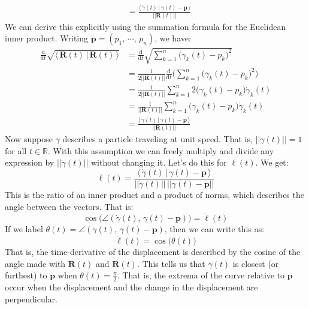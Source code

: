 \documentclass{article}
\theoremstyle{normal}
\newenvironment{example}{%
    \pushQED{\qed}\renewcommand{\qedsymbol}{$\blacksquare$}\examplex%
}{%
    \popQED\endexamplex%
}
\begin{document}
\begin{example}[\textbf{Displacements and Angles}]
\begin{align}
            &=
            \frac{\langle\,\dot{\gamma}(t)\,|\,\gamma(t)-\mathbf{p}\,\rangle}
                {||\mathbf{R}(t)||}
        \end{align}
        We can derive this explicitly using the summation formula for the
        Euclidean inner product. Writing
        $\mathbf{p}=(p_{1},\,\cdots,\,p_{n})$, we have:
        \begin{align}
            \frac{\textrm{d}}{\textrm{d}t}
            \sqrt{\langle\,\mathbf{R}(t)\,|\,\mathbf{R}(t)\,\rangle}
            &=\frac{\textrm{d}}{\textrm{d}t}
            \sqrt{\sum_{k=1}^{n}\big(\gamma_{k}(t)-p_{k}\big)^{2}}\\
            &=
            \frac{1}{2||\mathbf{R}(t)||}
            \frac{\textrm{d}}{\textrm{d}t}\Big(
                \sum_{k=1}^{n}\big(\gamma_{k}(t)-p_{k}\big)^{2}
            \Big)\\
            &=
            \frac{1}{2||\mathbf{R}(t)||}
            \sum_{k=1}^{n}
            2\big(\gamma_{k}(t)-p_{k}\big)\dot{\gamma}_{k}(t)\\
            &=
            \frac{1}{||\mathbf{R}(t)||}
            \sum_{k=1}^{n}
            \big(\gamma_{k}(t)-p_{k}\big)\dot{\gamma}_{k}(t)\\
            &=
            \frac{\langle\,\dot{\gamma}(t)\,|\,\gamma(t)-\mathbf{p}\,\rangle}
                {||\mathbf{R}(t)||}
        \end{align}
        Now suppose $\gamma$ describes a particle traveling at unit speed.
        That is, $||\dot{\gamma}(t)||=1$ for all $t\in\mathbb{R}$. With this
        assumption we can freely multiply and divide any expression by
        $||\dot{\gamma}(t)||$ without changing it. Let's do this for
        $\dot{\ell}(t)$. We get:
        \begin{equation}
            \dot{\ell}(t)
            =\frac{\langle\,\dot{\gamma}(t)\,|\,\gamma(t)-\mathbf{p}\,\rangle}
                {||\dot{\gamma}(t)||\,||\gamma(t)-\mathbf{p}||}
        \end{equation}
        This is the ratio of an inner product and a product of norms, which
        describes the angle between the vectors. That is:
        \begin{equation}
            \cos\big(
                \angle(\dot{\gamma}(t),\,\gamma(t)-\mathbf{p})
            \big)=\dot{\ell}(t)
        \end{equation}
        If we label
        $\theta(t)=\angle(\dot{\gamma}(t),\,\gamma(t)-\mathbf{p})$, then we
        can write this as:
        \begin{equation}
            \dot{\ell}(t)
            =\cos\big(\theta(t)\big)
        \end{equation}
        That is, the time-derivative of the displacement is described by
        the cosine of the angle made with
        $\mathbf{R}(t)$ and $\dot{\mathbf{R}}(t)$. This tells us that
        $\gamma(t)$ is closest (or furthest) to $\mathbf{p}$ when
        $\theta(t)=\frac{\pi}{2}$. That is, the extrema of the curve relative
        to $\mathbf{p}$ occur when the displacement and the change in the
        displacement are perpendicular.
    \end{example}
\end{document}

